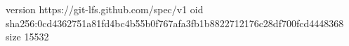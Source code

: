 version https://git-lfs.github.com/spec/v1
oid sha256:0cd4362751a81fd4bc4b55b0f767afa3fb1b8822712176c28df700fcd4448368
size 15532
